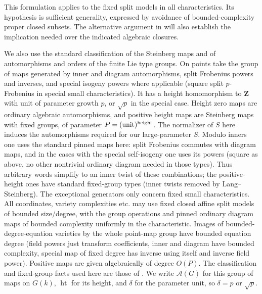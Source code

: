 This formulation applies to the fixed split models in all characteristics. Its hypothesis is sufficient generality, expressed by avoidance of bounded-complexity proper closed subsets. The alternative argument in  will also establish the implication needed over the indicated algebraic closures.

\begin{convention}\label{w:point-maps}
We also use the standard classification of the Steinberg maps and of automorphisms and orders of the finite Lie type groups. On points take the group of maps generated by inner and diagram automorphisms, split Frobenius powers and inverses, and special isogeny powers where applicable (square split \(p\)-Frobenius in special small characteristics). It has a height homomorphism to \(\mathbf Z\) with unit of parameter growth \(p\), or \(\sqrt p\) in the special case. Height zero maps are ordinary algebraic automorphisms, and positive height maps are Steinberg maps with fixed groups, of parameter \(P=(\text{unit})^{\rm height}\). The normalizer of \(S\) here induces the automorphisms required for our large-parameter \(S\). Modulo inners one uses the standard pinned maps here: split Frobenius commutes with diagram maps, and in the cases with the special self-isogeny one uses its powers (square as above, no other nontrivial ordinary diagram needed in those types). Thus arbitrary words simplify to an inner twist of these combinations; the positive-height ones have standard fixed-group types (inner twists removed by Lang--Steinberg). The exceptional generators only concern fixed small characteristics. All coordinates, variety complexities etc. may use fixed closed affine split models of bounded size/degree, with the group operations and pinned ordinary diagram maps of bounded complexity uniformly in the characteristic. Images of bounded-degree-equation varieties by the whole point-map group have bounded equation degree (field powers just transform coefficients, inner and diagram have bounded complexity, special map of fixed degree has inverse using itself and inverse field power). Positive maps are given algebraically of degree \(O(P)\). The classification and fixed-group facts used here are those of \citet{Steinberg1968,GLS1994}. We write $\mathcal A(G)$ for this group of maps on $G(k)$, $\operatorname{ht}$ for its height, and $\delta$ for the parameter unit, so $\delta=p$ or $\sqrt p$.
\end{convention}


